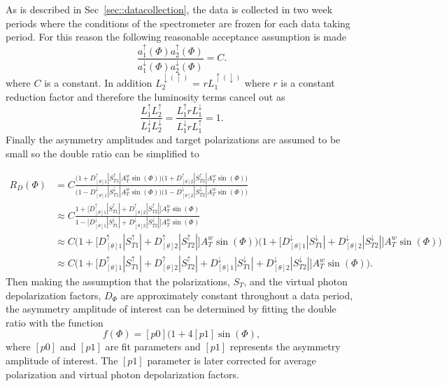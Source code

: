 \noindent
As is described in Sec~\ref{sec::datacollection}, the data is collected in two
week periods where the conditions of the spectrometer are frozen for each data
taking period.  For this reason the following reasonable acceptance assumption
is made
\begin{equation}
  \label{equ::a_resonable_assump}
  \frac{a_1^\uparrow(\Phi) a_2^\uparrow(\Phi)}
       {a_1^\downarrow(\Phi) a_2^\downarrow(\Phi)}
       = C.
\end{equation}
\noindent
where $C$ is a constant.  In addition
$L^{\downarrow(\uparrow)}_2$ = $rL^{\uparrow(\downarrow)}_1$ where $r$ is a
constant reduction factor and therefore the luminosity terms cancel out as
\begin{equation}
  \frac{L_1^{\uparrow}L_2^{\uparrow}}{L_1^{\downarrow}L_2^{\downarrow}}
  = \frac{L_1^{\uparrow}rL_1^{\downarrow}}{L_1^{\downarrow}rL_1^{\uparrow}}
  = 1.
\end{equation}
\noindent
Finally the asymmetry amplitudes and target polarizations are assumed to be
small so the double ratio can be simplified to

\begin{align}
  R_D(\Phi) &=
  C\frac{\Big(1+D_{[\theta]1}^{\uparrow}|S_{T1}^{\uparrow}|A^w_T\sin(\Phi)\Big)
    \Big(1+D_{[\theta]2}^{\uparrow}|S_{T2}^{\uparrow}|A^w_T\sin(\Phi)\Big)}
  {\Big(1-D_{[\theta]1}^{\downarrow}|S_{T1}^{\downarrow}|A^w_T\sin(\Phi)\Big)
    \Big(1-D_{[\theta]2}^{\downarrow}|S_{T2}^{\downarrow}|A^w_T\sin(\Phi)\Big)}
  \\ \nonumber &\approx
  C\frac{1+\Big[D_{[\theta]1}^{\uparrow}|S_{T1}^{\uparrow}|+D_{[\theta]2}^{\uparrow}|S_{T2}^{\uparrow}|\Big]
    A^w_T\sin(\Phi)}
  {1-\Big[D_{[\theta]1}^{\downarrow}|S_{T1}^{\downarrow}|+D_{[\theta]2}^{\downarrow}|S_{T2}^{\downarrow}|\Big]
    A^w_T\sin(\Phi)} \\ \nonumber &\approx
  C\Big(1+\Big[D_{[\theta]1}^{\uparrow}|S_{T1}^{\uparrow}|+D_{[\theta]2}^{\uparrow}|S_{T2}^{\uparrow}|\Big]
  A^w_T\sin(\Phi)\Big)\Big(1+\Big[D_{[\theta]1}^{\downarrow}|S_{T1}^{\downarrow}|+D_{[\theta]2}^{\downarrow}|S_{T2}^{\downarrow}|\Big]
  A^w_T\sin(\Phi)\Big) \\ \nonumber &\approx C\Big(1 +
  \Big[D_{[\theta]1}^{\uparrow}|S_{T1}^{\uparrow}|+D_{[\theta]2}^{\uparrow}|S_{T2}^{\uparrow}|+D_{[\theta]1}^{\downarrow}|S_{T1}^{\downarrow}|+D_{[\theta]2}^{\downarrow}|S_{T2}^{\downarrow}|\Big]A^w_T\sin(\Phi)\Big).
\end{align}
\noindent
Then making the assumption that the polarizations, $S_T$, and the virtual photon
depolarization factors, $D_{\Phi}$ are approximately constant throughout a data
period, the asymmetry amplitude of interest can be determined by fitting the
double ratio with the function
\begin{equation}
  \label{equ::dr_fit_formula}
  f(\Phi) = [p0](1+4[p1]\sin(\Phi),
\end{equation}
\noindent
where $[p0]$ and $[p1]$ are fit parameters and $[p1]$ represents the asymmetry
amplitude of interest.  The $[p1]$ parameter is later corrected for average
polarization and virtual photon depolarization factors.

